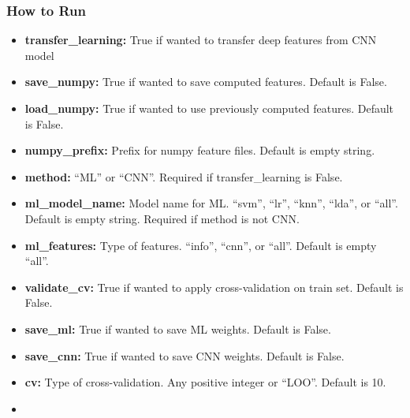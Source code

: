 
\subsubsection*{How to Run}\label{how-to-run}

\begin{itemize}
\itemsep1pt\parskip0pt
\item
 \textbf{transfer\_learning:} True if wanted to transfer deep features from CNN
  model\\
\item
  \textbf{save\_numpy:} True if wanted to save computed features. Default is
  False.\\
\item
  \textbf{load\_numpy:} True if wanted to use previously computed features.
  Default is False.\\
\item
  \textbf{numpy\_prefix:} Prefix for numpy feature files. Default is empty
  string.\\
\item
  \textbf{method:} ``ML'' or ``CNN''. Required if transfer\_learning is False.\\
\item
  \textbf{ml\_model\_name:} Model name for ML. ``svm'', ``lr'', ``knn'', ``lda'',
  or ``all''. Default is empty string. Required if method is not CNN.\\
\item
  \textbf{ml\_features:} Type of features. ``info'', ``cnn'', or ``all''. Default
  is empty ``all''.\\
\item
  \textbf{validate\_cv:} True if wanted to apply cross-validation on train set.
  Default is False.\\
\item
  \textbf{save\_ml:} True if wanted to save ML weights. Default is False.\\
\item
  \textbf{save\_cnn:} True if wanted to save CNN weights. Default is False.\\
\item
  \textbf{cv:} Type of cross-validation. Any positive integer or ``LOO''. Default
  is 10.\\
\item

\end{itemize}

